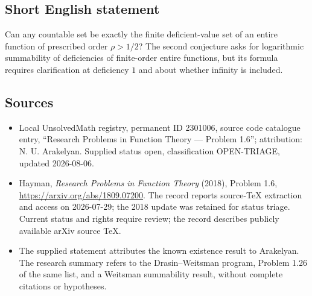 \documentclass[11pt]{article}
\begin{document}
\subsection{Short English statement}
Can any countable set be exactly the finite deficient-value set of an entire function of prescribed order $\rho>1/2$? The second conjecture asks for logarithmic summability of deficiencies of finite-order entire functions, but its formula requires clarification at deficiency $1$ and about whether infinity is included.
\subsection{Sources}
\begin{itemize}
\item Local UnsolvedMath registry, permanent ID 2301006, source code catalogue entry, ``Research Problems in Function Theory --- Problem 1.6''; attribution: N. U. Arakelyan. Supplied status open, classification OPEN-TRIAGE, updated 2026-08-06.
\item Hayman, \emph{Research Problems in Function Theory} (2018), Problem 1.6, \url{https://arxiv.org/abs/1809.07200}. The record reports source-TeX extraction and access on 2026-07-29; the 2018 update was retained for status triage. Current status and rights require review; the record describes publicly available arXiv source TeX.
\item The supplied statement attributes the known existence result to Arakelyan. The research summary refers to the Drasin--Weitsman program, Problem 1.26 of the same list, and a Weitsman summability result, without complete citations or hypotheses.
\end{itemize}
\end{document}

